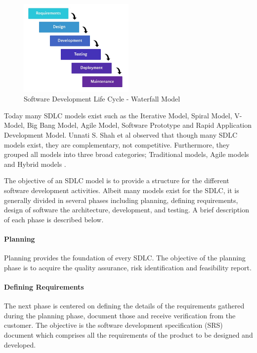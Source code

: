 \begin{figure}
    \centering
    \includegraphics[width=0.5\textwidth]{../../img/chapter_2/sdlc-waterfall.jpg}
    \caption{Software Development Life Cycle - Waterfall Model}
    \label{fig:sdlc-waterfall}
\end{figure}

Today many SDLC models exist such as the Iterative Model, Spiral Model, V-Model, Big Bang Model, Agile Model, Software Prototype and Rapid Application Development Model. Unnati S. Shah et al observed that though many SDLC models exist, they are complementary, not competitive. Furthermore, they grouped all models into three broad categories; Traditional models, Agile models and Hybrid models \cite{Shah_2016}.

The objective of an SDLC model is to provide a structure for the different software development activities.  Albeit many models exist for the SDLC, it is generally divided in several phases including planning, defining requirements, design of software the architecture, development, and testing. A brief description of each phase is described below.

\paragraph{Planning}
Planning provides the foundation of every SDLC. The objective of the planning phase is to acquire the quality assurance, risk identification and feasibility report. 

\paragraph{Defining Requirements}
The next phase is centered on defining the details of the requirements gathered during the planning phase, document those and receive verification from the customer. The objective is the software development specification (SRS) document which comprises all the requirements of the product to be designed and developed.

